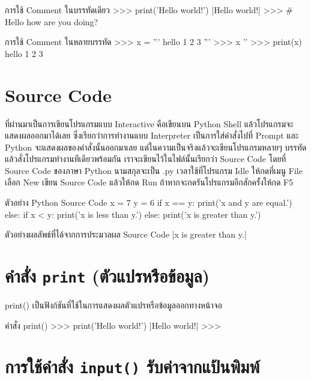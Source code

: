 \begin{codelist}{การใช้ Comment ในบรรทัดเดียว}{}
>>> print('Hello world!')
|Hello world!|
>>> # Hello how are you doing?
\end{codelist}

\begin{codelist}{การใช้ Comment ในหลายบรรทัด}{}
>>> x = '''
hello
1
2
3
'''
>>> x
'\nhello{}\n'
>>> print(x)
hello
1
2
3
\end{codelist}


\section{Source Code}

ที่ผ่านมาเป็นการเขียนโปรแกรมแบบ Interactive คือเขียนบน Python Shell แล้วโปรแกรมจะแสดงผลออกมาได้เลย ซึ่งเรียกว่าการทำงานแบบ Interpreter เป็นการใส่คำสั่งไปที่ Prompt และ Python จะแสดงผลของคำสั่งนั้นออกมาเลย แต่ในความเป็นจริงแล้วจะเขียนโปรแกรมหลายๆ บรรทัดแล้วสั่งโปรแกรมทำงานทีเดียวพร้อมกัน เราจะเขียนไว้ในไฟล์นั้นเรียกว่า Source Code โดยที่ Source Code ของภาษา Python นามสกุลจะเป็น .py เวลาใช้ที่โปรแกรม Idle ให้กดที่เมนู File เลือก New เขียน Source Code แล้วให้กด Run ถ้าหากจะกดรันโปรแกรมอีกสักครั้งให้กด F5

\begin{codelist}{ตัวอย่าง Python Source Code}{}
x = 7
y = 6
if x == y: print('x and y are equal.')
else:
    if x < y: print('x is less than y.')
    else: print('x is greater than y.')
\end{codelist}

\begin{codelist}{ตัวอย่างผลลัพธ์ที่ได้จากการประมวลผล Source Code}{}
|x is greater than y.|
\end{codelist}


\section{คำสั่ง \texttt{print} (ตัวแปรหรือข้อมูล)}

print() เป็นฟังก์ชันที่ใช้ในการแสดงผลตัวแปรหรือข้อมูลออกทางหน้าจอ 

\begin{codelist}{คำสั่ง print()}{}
>>> print('Hello world!')
|Hello world!|
>>>
\end{codelist}


\section{การใช้คำสั่ง \texttt{input()} รับค่าจากแป้นพิมพ์}

